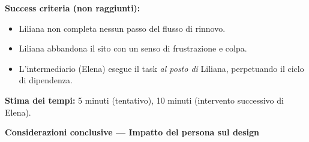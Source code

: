 \documentclass[11pt,a4paper]{article}
\begin{document}
\begin{tcolorbox}[colback=backgroundColor,colframe=borderColor,arc=2mm]
{    \textbf{Success criteria (non raggiunti):}
    \begin{itemize}
        \item Liliana non completa nessun passo del flusso di rinnovo.
        \item Liliana abbandona il sito con un senso di frustrazione e colpa.
        \item L'intermediario (Elena) esegue il task \textit{al posto di} Liliana, perpetuando il ciclo di dipendenza.
    \end{itemize}

    \textbf{Stima dei tempi:} 5 minuti (tentativo), 10 minuti (intervento successivo di Elena).
    }
\end{tcolorbox}

\newpage


\begin{tcolorbox}[colback=primaryColor!10,colframe=primaryColor,arc=2mm]
    \textbf{Considerazioni conclusive --- Impatto del persona sul design}
\end{tcolorbox}

\vspace{0.3cm}
\end{document}
